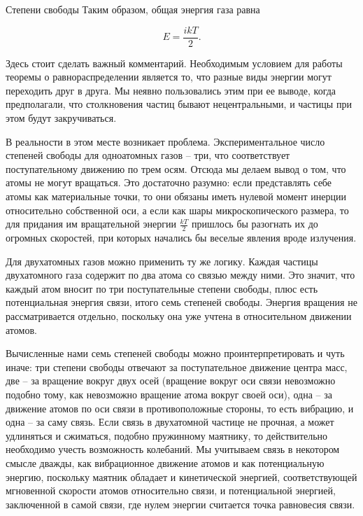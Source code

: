 \documentclass{article}
\begin{document}
\begin{section}{Степени свободы}
		Таким образом, общая энергия газа равна

		\begin{equation*}
			E = \frac{ikT}{2}.
		\end{equation*}

		Здесь стоит сделать важный комментарий. Необходимым условием для работы теоремы о равнораспределении является то, что разные виды энергии могут переходить друг в друга. Мы неявно пользовались этим при ее выводе, когда предполагали, что столкновения частиц бывают нецентральными, и частицы при этом будут закручиваться.

		В реальности в этом месте возникает проблема. Экспериментальное число степеней свободы для одноатомных газов -- три, что соответствует поступательному движению по трем осям. Отсюда мы делаем вывод о том, что атомы не могут вращаться. Это достаточно разумно: если представлять себе атомы как материальные точки, то они обязаны иметь нулевой момент инерции относительно собственной оси, а если как шары микроскопического размера, то для придания им вращательной энергии $\frac{kT}{2}$ пришлось бы разогнать их до огромных скоростей, при которых начались бы веселые явления вроде излучения.

		Для двухатомных газов можно применить ту же логику. Каждая частицы двухатомного газа содержит по два атома со связью между ними. Это значит, что каждый атом вносит по три поступательные степени свободы, плюс есть потенциальная энергия связи, итого семь степеней свободы. Энергия вращения не рассматривается отдельно, поскольку она уже учтена в относительном движении атомов.

		Вычисленные нами семь степеней свободы можно проинтерпретировать и чуть иначе: три степени свободы отвечают за поступательное движение центра масс, две -- за вращение вокруг двух осей (вращение вокруг оси связи невозможно подобно тому, как невозможно вращение атома вокруг своей оси), одна -- за движение атомов по оси связи в противоположные стороны, то есть вибрацию, и одна -- за саму связь.  Если связь в двухатомной частице не прочная, а может удлиняться и сжиматься, подобно пружинному маятнику, то действительно необходимо учесть возможность колебаний. Мы учитываем связь в некотором смысле дважды, как вибрационное движение атомов и как потенциальную энергию, поскольку маятник обладает и кинетической энергией, соответствующей мгновенной скорости атомов относительно связи, и потенциальной энергией, заключенной в самой связи, где нулем энергии считается точка равновесия связи.


\end{section}
\end{document}
